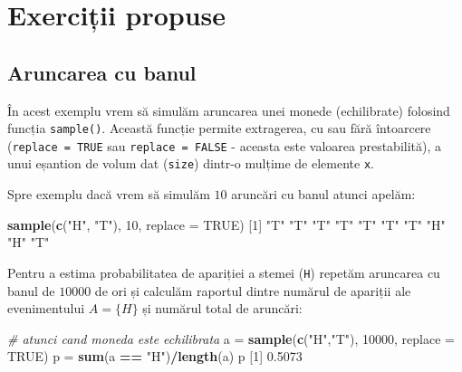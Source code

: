 \documentclass[]{article}
\newenvironment{Shaded}{\begin{snugshade}}{\end{snugshade}}
\newcommand{\KeywordTok}[1]{\textcolor[rgb]{0.13,0.29,0.53}{\textbf{#1}}}
\newcommand{\DataTypeTok}[1]{\textcolor[rgb]{0.13,0.29,0.53}{#1}}
\newcommand{\DecValTok}[1]{\textcolor[rgb]{0.00,0.00,0.81}{#1}}
\newcommand{\FloatTok}[1]{\textcolor[rgb]{0.00,0.00,0.81}{#1}}
\newcommand{\StringTok}[1]{\textcolor[rgb]{0.31,0.60,0.02}{#1}}
\newcommand{\CommentTok}[1]{\textcolor[rgb]{0.56,0.35,0.01}{\textit{#1}}}
\newcommand{\OtherTok}[1]{\textcolor[rgb]{0.56,0.35,0.01}{#1}}
\newcommand{\OperatorTok}[1]{\textcolor[rgb]{0.81,0.36,0.00}{\textbf{#1}}}
\newcommand{\NormalTok}[1]{#1}
\begin{document}
\section{Exerciții propuse}\label{exercitii-propuse}

\subsection{Aruncarea cu banul}\label{aruncarea-cu-banul}

În acest exemplu vrem să simulăm aruncarea unei monede (echilibrate)
folosind funcția \texttt{sample()}. Această funcție permite extragerea,
cu sau fără întoarcere (\texttt{replace\ =\ TRUE} sau
\texttt{replace\ =\ FALSE} - aceasta este valoarea prestabilită), a unui
eșantion de volum dat (\texttt{size}) dintr-o mulțime de elemente
\texttt{x}.

Spre exemplu dacă vrem să simulăm \(10\) aruncări cu banul atunci
apelăm:

\begin{Shaded}
\begin{Highlighting}[]
\KeywordTok{sample}\NormalTok{(}\KeywordTok{c}\NormalTok{(}\StringTok{"H"}\NormalTok{, }\StringTok{"T"}\NormalTok{), }\DecValTok{10}\NormalTok{, }\DataTypeTok{replace =} \OtherTok{TRUE}\NormalTok{)}
\NormalTok{ [}\DecValTok{1}\NormalTok{] }\StringTok{"T"} \StringTok{"T"} \StringTok{"T"} \StringTok{"T"} \StringTok{"T"} \StringTok{"T"} \StringTok{"T"} \StringTok{"H"} \StringTok{"H"} \StringTok{"T"}
\end{Highlighting}
\end{Shaded}

Pentru a estima probabilitatea de apariției a stemei (\texttt{H})
repetăm aruncarea cu banul de \(10000\) de ori și calculăm raportul
dintre numărul de apariții ale evenimentului \(A=\{H\}\) și numărul
total de aruncări:

\begin{Shaded}
\begin{Highlighting}[]
\CommentTok{# atunci cand moneda este echilibrata}
\NormalTok{a =}\StringTok{ }\KeywordTok{sample}\NormalTok{(}\KeywordTok{c}\NormalTok{(}\StringTok{"H"}\NormalTok{,}\StringTok{"T"}\NormalTok{), }\DecValTok{10000}\NormalTok{, }\DataTypeTok{replace =} \OtherTok{TRUE}\NormalTok{)}
\NormalTok{p =}\StringTok{ }\KeywordTok{sum}\NormalTok{(a }\OperatorTok{==}\StringTok{ "H"}\NormalTok{)}\OperatorTok{/}\KeywordTok{length}\NormalTok{(a)}
\NormalTok{p}
\NormalTok{[}\DecValTok{1}\NormalTok{] }\FloatTok{0.5073}
\end{Highlighting}
\end{Shaded}
\end{document}
